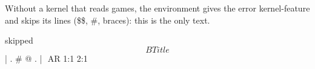 \documentclass{article}
\begin{document}
Without a kernel that reads games, the environment gives the error kernel-feature and skips its
lines (\$\$, \#, braces): this is the only text.
\begin{pgfgosgf}{skipped}
$$B Title
$$ | . # @ . |
$$ {AR 1:1 2:1}
\end{pgfgosgf}
\end{document}
